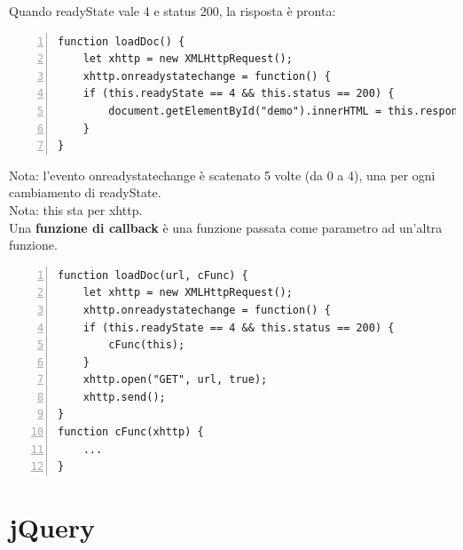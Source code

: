Quando readyState vale 4 e status 200, la risposta è pronta:
\begin{Verbatim}[frame = single, numbers = left]
function loadDoc() {
    let xhttp = new XMLHttpRequest();
    xhttp.onreadystatechange = function() {
    if (this.readyState == 4 && this.status == 200) {
        document.getElementById("demo").innerHTML = this.responseText;
    }
}
\end{Verbatim}
Nota: l'evento onreadystatechange è scatenato 5 volte (da 0 a 4), una per ogni cambiamento di readyState.\\
Nota: this sta per xhttp.\\

Una \textbf{funzione di callback} è una funzione passata come parametro ad un'altra funzione. 
\begin{Verbatim}[frame = single, numbers = left]
function loadDoc(url, cFunc) {
    let xhttp = new XMLHttpRequest();
    xhttp.onreadystatechange = function() {
    if (this.readyState == 4 && this.status == 200) {
        cFunc(this);
    }
    xhttp.open("GET", url, true);
    xhttp.send();
}
function cFunc(xhttp) {
    ...
}
\end{Verbatim}

\chapter{jQuery}
